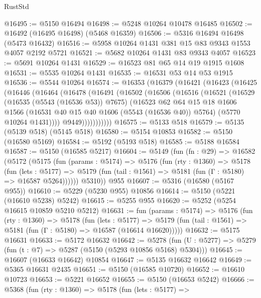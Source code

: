 \begin{lexlean}{RustStd}
\begin{coremodule}
@16495 := @5150 @16494
@16498 := @5248 @10264 @10478 @16485
@16502 := @16492 (@16495 @16498) (@5468 @16359)
@16506 := @5316 @16494 @16498 (@5473 @16432)
@16516 := @5958 @10264 @1431 @381 @15 @83 @9343 @1553 @4057 @2192 @5721
@16521 := @5682 @10264 @1431 @83 @9343 @4057
@16523 := @5691 @10264 @1431
@16529 := @16523 @81 @65 @14 @19 @1915 @1608
@16531 := @5535 @10264 @1431
@16535 := @16531 @53 @14 @53 @1915
@16536 := @5544 @10264
@16574 := @16353
    (@16379
      (@16421
        (@16423
          (@16425
            (@16446
              (@16464
                (@16478
                  (@16491
                    (@16502
                      (@16506
                        (@16516
                          (@16521
                            (@16529
                              (@16535 (@5543 (@16536 @53)) @7675)
                              (@16523
                                @62
                                @64
                                @15
                                @18
                                @1606
                                @1566
                                (@16531 @40 @15 @40 @1606 (@5543 (@16536 @40)) @5764)
                                (@5770 @10264 @1431))))
                          @9449)))))))))))
@16575 := @5133 @518
@16579 := @5135 (@5139 @518) (@5145 @518)
@16580 := @5154 @10853
@16582 := @5150 (@16580 @5169)
@16584 := @5192 (@5193 @518)
@16585 := @5188 @16584
@16587 := @5150 (@16585 @5217)
@16604 := @5149
    (fun (fn : @29) =>
    @16582
      (@5172
        (@5175
          (fun (params : @5174) =>
          @5176
            (fun (rty : @1360) =>
            @5178
              (fun (lets : @5177) =>
              @5179 (fun (tail : @1561) => @5181 (fun (Γ : @5180) => @16587 @5264))))))
        @5310))
    @955
@16607 := @5316 (@16580 (@5167 @955))
@16610 := @5229 (@5230 @955) @10856
@16614 := @5150 (@5221 (@16610 @5238) @5242)
@16615 := @5255 @955
@16620 := @5252 (@5254 @16615 @10859 @5210 @5212)
@16631 := fun (params : @5174) =>
  @5176
    (fun (rty : @1360) =>
    @5178
      (fun (lets : @5177) =>
      @5179 (fun (tail : @1561) => @5181 (fun (Γ : @5180) => @16587 (@16614 @16620)))))
@16632 := @5175 @16631
@16633 := @5172 @16632
@16642 := @5278
    (fun (U : @5277) => @5279 (fun (t : @7) => @5287 (@5150 (@5293 @10856 @5168) @5304)))
@16645 := @16607 (@16633 @16642) @10854
@16647 := @5135 @16632 @16642
@16649 := @5365 @16631 @2435
@16651 := @5150 (@16585 @10720)
@16652 := @16610 @10723
@16653 := @5221 @16652
@16655 := @5150 (@16653 @5242)
@16666 := @5368
    (fun (rty : @1360) =>
    @5178
      (fun (lets : @5177) =>

\end{coremodule}
\end{lexlean}
